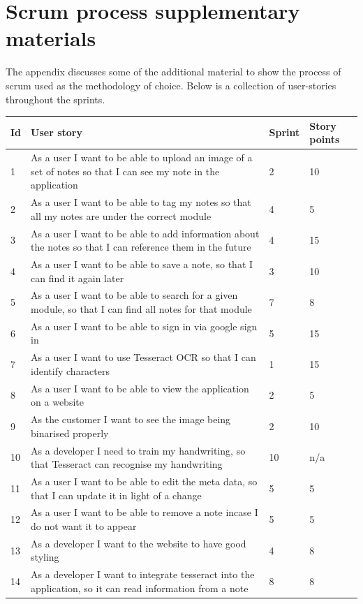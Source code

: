 \chapter{Scrum process supplementary materials}
The appendix discusses some of the additional material to show the process of scrum used as the methodology of choice.
Below is a collection of user-stories throughout the sprints.

\begin{table}[h!]
\centering
\begin{tabular}{||p{1cm} p{10cm} p{1cm} p{1cm}||}
   \hline
 Id & User story & Sprint & Story points \\ [0.5ex]
 \hline\hline
 1 & As a user I want to be able to upload an image of a set of notes so that I can see my note in the application & 2	& 10 \\
 2 & As a user I want to be able to tag my notes so that  all my notes are under the correct module	& 4	 & 5 \\
 3&As a user I want to be able to add information about the notes so that I can reference them in the future&4&15 \\
 4&As a user I want to be able to save a note, so that I can find it again later&3&10 \\
 5&As a user I want to be able to search for a given module, so that I can find all notes for that module&7&8 \\
 6&As a user I want to be able to sign in via google sign in&5&15 \\
 7&As a user I want to use Tesseract OCR so that I can identify characters&1&15 \\
 8&As a user I want to be able to view the application on a website&2&5 \\
 9&As the customer I want to see the image being binarised properly&2&10 \\
 10&As a developer I need to train my handwriting, so that Tesseract can recognise my handwriting&10&n/a \\
 11&As a user I want to be able to edit the meta data, so that I can update it in light of a change&5&5 \\
 12&As a user I want to be able to remove a note incase I do not want it to appear&5&5 \\
 13&As a developer I want to the website to have good styling&4&8 \\
 14&As a developer I want to integrate tesseract into the application, so it can read information from a note&8&8 \\

\end{tabular}
\end{table}
